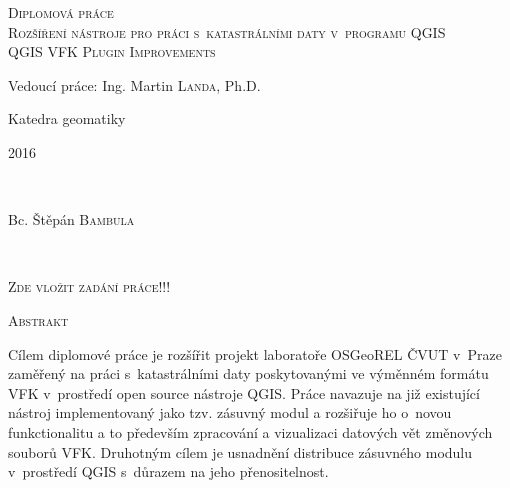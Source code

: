 \documentclass[12pt]{article}
\begin{document}
\begin{titlepage}
\textsc{\Large Diplomová práce}\\
\vfill
\textsc{\LARGE  Rozšíření nástroje pro práci s~katastrálními daty v~programu QGIS}\\[0.5cm] %

\textsc{\Large QGIS VFK Plugin Improvements}
 
 
 \vfill
\large Vedoucí práce: Ing. Martin \textsc{Landa}, Ph.D.

Katedra geomatiky
 
\vfill
\begin{minipage}{0.4\textwidth}
\begin{flushleft} 
\large 2016	%
\end{flushleft}
\end{minipage}
~
\begin{minipage}{0.4\textwidth}
\begin{flushright} 
\large Bc. Štěpán \textsc{Bambula} \\ %
\end{flushright}
\end{minipage}\\[1cm]
 
\end{titlepage}

\clearpage
\pagestyle{empty}

\vspace*{\fill}
\begin{center}
\textsc{\Large Zde vložit zadání práce!!!}
\end{center}

\vspace*{\fill}

\clearpage

\hfill

\noindent
\textsc{\Large Abstrakt}

\vspace{12pt}

Cílem diplomové práce je rozšířit projekt laboratoře OSGeoREL ČVUT v~Praze zaměřený na práci s~katastrálními daty poskytovanými ve výměnném formátu VFK v~prostředí open source nástroje QGIS. Práce navazuje na již existující nástroj implementovaný jako tzv. zásuvný modul a rozšiřuje ho o~novou funkctionalitu a to především zpracování a vizualizaci datových vět změnových souborů VFK. Druhotným cílem je usnadnění distribuce zásuvného modulu v~prostředí QGIS s~důrazem na jeho přenositelnost.
\end{document}
